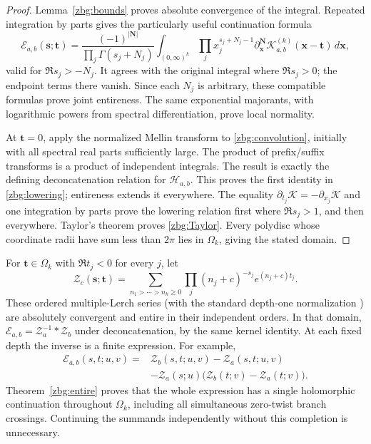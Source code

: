 \begin{proof}
Lemma~\ref{zbg:bounds} proves absolute convergence of the integral.
Repeated integration by parts gives the particularly useful continuation
formula
\begin{equation}\label{zbg:continuation}
 \mathscr E_{a,b}(\boldsymbol s;\boldsymbol t)
 =\frac{(-1)^{|\boldsymbol N|}}
             {\prod_j\Gamma(s_j+N_j)}
    \int_{(0,\infty)^k}\prod_jx_j^{s_j+N_j-1}
      \partial_{\boldsymbol x}^{\boldsymbol N}
          \mathscr K_{a,b}^{(k)}(\boldsymbol x-\boldsymbol t)
                                                    \,d\boldsymbol x,
\end{equation}
valid for $\Re s_j>-N_j$.  It agrees with the original integral
where $\Re s_j>0$; the endpoint terms there vanish.  Since each
$N_j$ is arbitrary, these compatible formulas prove joint entireness.
The same exponential majorants, with logarithmic powers from spectral
differentiation, prove local normality.

At $\boldsymbol t=0$, apply the normalized Mellin transform to
\eqref{zbg:convolution}, initially with all spectral real parts
sufficiently large.  The product of prefix/suffix transforms is a
product of independent integrals.  The result is exactly the defining
deconcatenation relation for $\mathcal H_{a,b}$.  This proves the
first identity in \eqref{zbg:lowering}; entireness extends it everywhere.
The equality $\partial_{t_j}\mathscr K=-\partial_{x_j}\mathscr K$
and one integration by parts prove the lowering relation first where
$\Re s_j>1$, and then everywhere.  Taylor's theorem proves
\eqref{zbg:Taylor}.  Every polydisc whose coordinate radii have sum
less than $2\pi$ lies in $\Omega_k$, giving the stated domain.
\end{proof}

For $\boldsymbol t\in\Omega_k$ with $\Re t_j<0$ for every $j$, let
\[
 \mathscr Z_c(\boldsymbol s;\boldsymbol t)
 =\sum_{n_1>\cdots>n_k\geq0}
       \prod_j(n_j+c)^{-s_j}e^{(n_j+c)t_j}.
\]
These ordered multiple-Lerch series (with the standard depth-one
normalization \cite[\S25.14]{DLMFLerch}) are absolutely convergent and
entire in their independent orders.  In that domain,
$\mathscr E_{a,b}=\mathscr Z_a^{-1}*\mathscr Z_b$ under
deconcatenation, by the same kernel identity.  At each fixed depth the
inverse is a finite expression.  For example,
\begin{align*}
 \mathscr E_{a,b}(s,t;u,v)={}&
  \mathscr Z_b(s,t;u,v)-\mathscr Z_a(s,t;u,v)\\
 &-\mathscr Z_a(s;u)
               \bigl(\mathscr Z_b(t;v)-\mathscr Z_a(t;v)\bigr).
\end{align*}
Theorem~\ref{zbg:entire} proves that the whole expression has a
single holomorphic continuation throughout $\Omega_k$, including all
simultaneous zero-twist branch crossings.  Continuing the summands
independently without this completion is unnecessary.

